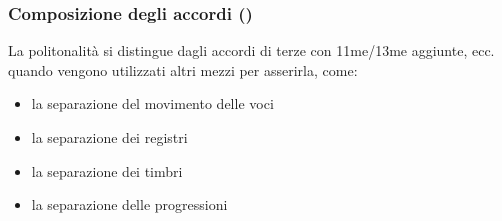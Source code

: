 \begin{frame}
    \frametitle{Composizione degli accordi ()}
    
	La politonalit\`a si distingue dagli accordi
	di terze con 11me/13me aggiunte, ecc.
	quando vengono utilizzati altri mezzi
	per asserirla, come:

  \begin{itemize}

      \item la separazione del movimento delle voci

      \item la separazione dei registri

      \item la separazione dei timbri

      \item la separazione delle progressioni

   \end{itemize}

\end{frame}
